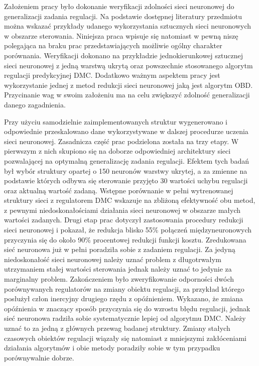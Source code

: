 \documentclass[
    left=2.5cm,         %
    right=2.5cm,        %
    top=2.5cm,          %
    bottom=3cm,         %
    bindingoffset=6mm,  %
    nohyphenation=false %
]{eiti/eiti-thesis}
\begin{document}
\cleardoublepage %
\streszczenie
\par Założeniem pracy było dokonanie weryfikacji zdolności sieci neuronowej do generalizacji zadania regulacji. Na podstawie dostępnej literatury przedmiotu można wskazać przykłady udanego wykorzystania sztucznych sieci neuronowych w obszarze sterowania. Niniejsza praca wpisuje się natomiast w pewną niszę polegająca na braku prac przedstawiających możliwie ogólny charakter porównania. Weryfikacji dokonano na przykładzie jednokierunkowej sztucznej sieci neuronowej z jedną warstwą ukrytą oraz powszechnie stosowanego algorytm regulacji predykcyjnej DMC. Dodatkowo ważnym aspektem pracy jest wykorzystanie jednej z metod redukcji sieci neuronowej jaką jest algorytm OBD. Przycinanie wag w swoim założeniu ma na celu zwiększyć zdolność generalizacji danego zagadnienia.
\par Przy użyciu samodzielnie zaimplementowanych struktur wygenerowano i odpowiednie przeskalowano dane wykorzystywane w dalszej procedurze uczenia sieci neuronowej. Zasadnicza część prac podzielona została na trzy etapy. W pierwszym z nich skupiono się na doborze odpowiedniej architektury sieci pozwalającej na optymalną generalizację zadania regulacji. Efektem tych badań był wybór struktury opartej o 150 neuronów warstwy ukrytej, a za zmienne na podstawie których odbywa się sterowanie przyjęto 30 wartości uchybu regulacji oraz aktualną wartość zadaną. Wstępne porównanie w pełni wytrenowanej struktury sieci z regulatorem DMC wskazuje na zbliżoną efektywność obu metod, z pewnymi niedoskonałościami działania sieci neuronowej w obszarze małych wartości zadanych. Drugi etap prac dotyczył zastosowania procedury redukcji sieci neuronowej i pokazał, że redukcja blisko 55\% połączeń międzyneuronowych przyczynia się do około 90\% procentowej redukcji funkcji kosztu. Zredukowana sieć neuronowa już w pełni poradziła sobie z zadaniem regulacji. Za jedyną niedoskonałość sieci neuronowej należy uznać problem z długotrwałym utrzymaniem stałej wartości sterowania jednak należy uznać to jedynie za marginalny problem. Zakończeniem było zweryfikowanie odporności dwóch porównywanych regulatorów na zmiany obiektu regulacji, za przykład którego posłużył człon inercyjny drugiego rzędu z opóźnieniem. Wykazano, że zmiana opóźnienia w znaczący sposób przyczynia się do wzrostu błędu regulacji, jednak sieć neuronowa radziła sobie systematycznie lepiej od algorytmu DMC. Należy uznać to za jedną z głównych przewag badanej struktury. Zmiany stałych czasowych obiektów regulacji wiązały się natomiast z mniejszymi zakłóceniami działania algorytmów i obie metody poradziły sobie w tym przypadku porównywalnie dobrze.
\end{document}
